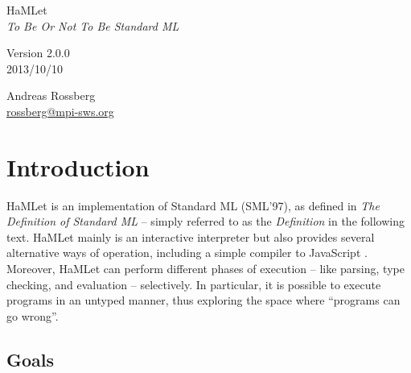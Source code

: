 \documentclass[twoside,titlepage]{article}
\begin{document}

\begin{titlepage}
\begin{center}

\vspace*{5cm}
{\Huge HaMLet} \\
\vspace{5mm}
{\large\it To Be Or Not To Be Standard ML} \\
\vspace{1cm}

\vspace{1cm}
Version 2.0.0 \\
2013/10/10

\vspace{3cm}
\large
Andreas Rossberg \\
\url{rossberg@mpi-sws.org}

\end{center}
\end{titlepage}


{
\setlength{\parskip}{0.5ex}
\tableofcontents
}

\vfill
\pagebreak


\section{Introduction}
\label{intro}

HaMLet is an implementation of Standard ML (SML'97), as defined in {\it The Definition of Standard ML} \cite{definition} -- simply referred to as the {\em Definition} in the following text. HaMLet mainly is an interactive interpreter but also provides several alternative ways of operation, including a simple compiler to JavaScript \cite{ecmascript}. Moreover, HaMLet can perform different phases of execution -- like parsing, type checking, and evaluation -- selectively. In particular, it is possible to execute programs in an untyped manner, thus exploring the space where ``programs can go wrong''.


\subsection{Goals}
\label{goals}
\end{document}

